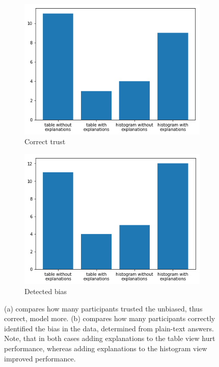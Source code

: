 \begin{figure}
\centering
\begin{subfigure}{0.45\linewidth}
\includegraphics[width=\linewidth]{aggexplain/stats/correctness}%
\caption{Correct trust}
\label{subfig:correctness}
\end{subfigure}%
\hfill%
\begin{subfigure}{0.45\linewidth}
\includegraphics[width=\linewidth]{aggexplain/stats/correct-detect}%
\caption{Detected bias}
\label{subfig:correctdetect}
\end{subfigure}%
\caption[Comparison of participants' trust and ability to detect the bias.]{
(a) compares how many participants trusted the unbiased, thus correct, model more.
(b) compares how many participants correctly identified the bias in the data, determined from plain-text answers.
Note, that in both cases adding explanations to the table view hurt performance, whereas adding explanations to the histogram view improved performance.
}
\label{figs:correctness}
\end{figure}

